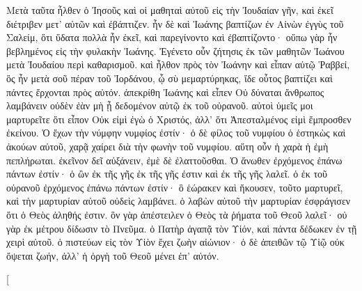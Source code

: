 \begin{pages}
\begin{Rightside}
		\pend
		\pstart
		Μετὰ ταῦτα ἦλθεν ὁ Ἰησοῦς καὶ οἱ μαθηταὶ αὐτοῦ εἰς τὴν Ἰουδαίαν γῆν, καὶ ἐκεῖ διέτριβεν μετ’ αὐτῶν καὶ ἐβάπτιζεν. ἦν δὲ καὶ Ἰωάνης βαπτίζων ἐν Αἰνὼν ἐγγὺς τοῦ Σαλείμ, ὅτι ὕδατα πολλὰ ἦν ἐκεῖ, καὶ παρεγίνοντο καὶ ἐβαπτίζοντο· οὔπω γὰρ ἦν βεβλημένος εἰς τὴν φυλακὴν Ἰωάνης. 
		\pend
		\pstart
		Ἐγένετο οὖν ζήτησις ἐκ τῶν μαθητῶν Ἰωάνου μετὰ Ἰουδαίου περὶ καθαρισμοῦ. καὶ ἦλθον πρὸς τὸν Ἰωάνην καὶ εἶπαν αὐτῷ Ῥαββεί, ὃς ἦν μετὰ σοῦ πέραν τοῦ Ἰορδάνου, ᾧ σὺ μεμαρτύρηκας, ἴδε οὗτος βαπτίζει καὶ πάντες ἔρχονται πρὸς αὐτόν. ἀπεκρίθη Ἰωάνης καὶ εἶπεν Οὐ δύναται ἄνθρωπος λαμβάνειν οὐδὲν ἐὰν μὴ ᾖ δεδομένον αὐτῷ ἐκ τοῦ οὐρανοῦ. αὐτοὶ ὑμεῖς μοι μαρτυρεῖτε ὅτι εἶπον Οὐκ εἰμὶ ἐγὼ ὁ Χριστός, ἀλλ’ ὅτι Ἀπεσταλμένος εἰμὶ ἔμπροσθεν ἐκείνου. Ὁ ἔχων τὴν νύμφην νυμφίος ἐστίν· ὁ δὲ φίλος τοῦ νυμφίου ὁ ἑστηκὼς καὶ ἀκούων αὐτοῦ, χαρᾷ χαίρει διὰ τὴν φωνὴν τοῦ νυμφίου. αὕτη οὖν ἡ χαρὰ ἡ ἐμὴ πεπλήρωται. ἐκεῖνον δεῖ αὐξάνειν, ἐμὲ δὲ ἐλαττοῦσθαι. 
		\pend
		\pstart
		Ὁ ἄνωθεν ἐρχόμενος ἐπάνω πάντων ἐστίν· ὁ ὢν ἐκ τῆς γῆς ἐκ τῆς γῆς ἐστιν καὶ ἐκ τῆς γῆς λαλεῖ. ὁ ἐκ τοῦ οὐρανοῦ ἐρχόμενος ἐπάνω πάντων ἐστίν· ὃ ἑώρακεν καὶ ἤκουσεν, τοῦτο μαρτυρεῖ, καὶ τὴν μαρτυρίαν αὐτοῦ οὐδεὶς λαμβάνει. ὁ λαβὼν αὐτοῦ τὴν μαρτυρίαν ἐσφράγισεν ὅτι ὁ Θεὸς ἀληθής ἐστιν. ὃν γὰρ ἀπέστειλεν ὁ Θεὸς τὰ ῥήματα τοῦ Θεοῦ λαλεῖ· οὐ γὰρ ἐκ μέτρου δίδωσιν τὸ Πνεῦμα. ὁ Πατὴρ ἀγαπᾷ τὸν Υἱόν, καὶ πάντα δέδωκεν ἐν τῇ χειρὶ αὐτοῦ. ὁ πιστεύων εἰς τὸν Υἱὸν ἔχει ζωὴν αἰώνιον· ὁ δὲ ἀπειθῶν τῷ Υἱῷ οὐκ ὄψεται ζωήν, ἀλλ’ ἡ ὀργὴ τοῦ Θεοῦ μένει ἐπ’ αὐτόν.
		\pend
        \endnumbering
    \end{Rightside}
    \begin{Leftside}
        \beginnumbering
        \pstart[

\end{Leftside}
\end{pages}
